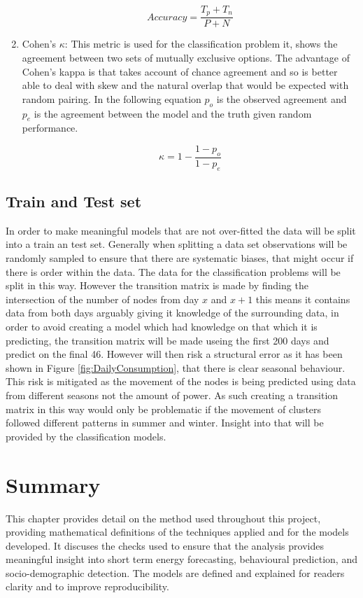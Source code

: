 \begin{enumerate}
    \begin{equation}
        Accuracy = \frac{T_p +T_n}{P+N}
    \end{equation}
    
    \item Cohen's $\kappa$: This metric is used for the classification problem it, shows the agreement between two sets of mutually exclusive options. The advantage of Cohen's kappa is that takes account of chance agreement and so is better able to deal with skew and the natural overlap that would be expected with random pairing. In the following equation $p_o$ is the observed agreement and $p_e$ is the agreement between the model and the truth given random performance.
    
    \begin{equation}
        \kappa = 1-\frac{1-p_o}{1-p_e}
    \end{equation}
    
\end{enumerate}

\subsection{Train and Test set}
In order to make meaningful models that are not over-fitted the data will be split into a train an test set. Generally when splitting a data set observations will be randomly sampled to ensure that there are systematic biases, that might occur if there is order within the data. The data for the classification problems will be split in this way. However the transition matrix is made by finding the intersection of the number of nodes from day $x$ and $x+1$ this means it contains data from both days arguably giving it knowledge of the surrounding data, in order to avoid creating a model which had knowledge on that which it is predicting, the transition matrix will be made useing the first 200 days and predict on the final 46. However will then risk a structural error as it has been shown in Figure \ref{fig:DailyConsumption}, that there is clear seasonal behaviour. This risk is mitigated as the movement of the nodes is being predicted using data from different seasons not the amount of power. As such creating a transition matrix in this way would only be problematic if the movement of clusters followed different patterns in summer and winter. Insight into that will be provided by the classification models.

\section{Summary}

This chapter provides detail on the method used throughout this project, providing mathematical definitions of the techniques applied and for the models developed. It discuses the checks used to ensure that the analysis provides meaningful insight into short term energy forecasting, behavioural prediction, and socio-demographic detection. The models are defined and explained for readers clarity and to improve reproducibility. 

